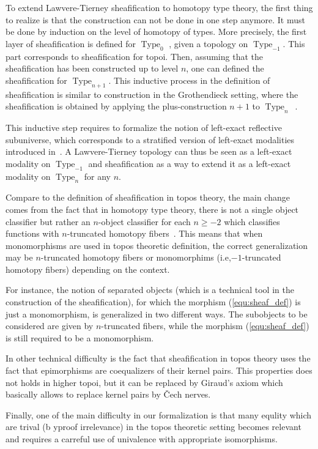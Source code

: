 \documentclass[conference]{IEEEtran}
\newcommand{\ie}{i.e,\xspace}
\DeclareMathOperator{\Type}{Type}
\begin{document}
To extend Lawvere-Tierney sheafification to homotopy type theory, the
first thing to realize is that the construction can not be done in one
step anymore. It must be done by induction on the level of homotopy of
types. More precisely, the first layer of sheafification is defined
for $\Type_{0}$ , given a topology on $\Type_{-1}$. This part
corresponds to sheafification for topoi. Then, assuming that the
sheafification has been constructed up to level $n$, one can defined
the sheafification for $\Type_{n+1}$.
%
This inductive process in the definition of sheafification is similar
to construction in the Grothendieck setting, where the
sheafification is obtained by applying the plus-construction $n+1$ to
$\Type_{n}$~\cite[Chapter~6]{lurie}.

This inductive step requires to formalize the notion of left-exact
reflective subuniverse, which corresponds to a stratified
version of left-exact modalities introduced
in~\cite[Chapter~7]{hottbook}. A Lawvere-Tierney topology can thus be
seen as a left-exact modality on $\Type_{-1}$ and sheafification as
a way to extend it as a left-exact modality on $\Type_{n}$ for any $n$.

Compare to the definition of sheafification in topos theory, the main
change comes from the fact that in homotopy type theory, there is not
a single object classifier but rather an $n$-object classifier for
each $n\geq -2$ which classifies functions with $n$-truncated homotopy
fibers~\cite{sets_in_hott}. This means that when monomorphisms are used in topos
theoretic definition, the correct generalization may be $n$-truncated homotopy
fibers or monomorphims (\ie $-1$-truncated homotopy
fibers) depending on the context.

For instance, the notion of separated objects (which is a technical
tool in the construction of the sheafification), for which the morphism
(\ref{equ:sheaf_def}) is just a monomorphism, is generalized in two
different ways.  
%
The subobjects to be considered are given by $n$-truncated fibers,
while the morphism (\ref{equ:sheaf_def}) is still required to be a
monomorphism.

In other technical difficulty is the fact that sheafification in topos
theory uses the fact that epimorphisms are coequalizers of their
kernel pairs. This properties does not holds in higher topoi, but it
can be replaced by Giraud's axiom which basically allows to replace 
 kernel pairs by \v{C}ech nerves.

Finally, one of the main difficulty in our formalization is that many
equlity which are trival (b yproof irrelevance) in the topos theoretic
setting becomes relevant and requires a carreful use of univalence
with appropriate isomorphisms.
\end{document}
